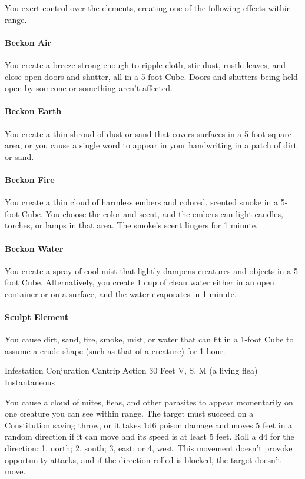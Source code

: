\documentclass[letterpaper,openany,oneside,twocolumn]{book}
\begin{document}
You exert control over the elements, creating one of the following effects within range.
\paragraph*{Beckon Air} You create a breeze strong enough to ripple cloth, stir dust, rustle leaves, and close open doors and shutter, all in a 5-foot Cube. Doors and shutters being held open by someone or something aren't affected.
\paragraph*{Beckon Earth} You create a thin shroud of dust or sand that covers surfaces in a 5-foot-square area, or you cause a single word to appear in your handwriting in a patch of dirt or sand.
\paragraph*{Beckon Fire} You create a thin cloud of harmless embers and colored, scented smoke in a 5-foot Cube. You choose the color and scent, and the embers can light candles, torches, or lamps in that area. The smoke's scent lingers for 1 minute.
\paragraph*{Beckon Water} You create a spray of cool mist that lightly dampens creatures and objects in a 5-foot Cube. Alternatively, you create 1 cup of clean water either in an open container or on a surface, and the water evaporates in 1 minute.
\paragraph*{Sculpt Element} You cause dirt, sand, fire, smoke, mist, or water that can fit in a 1-foot Cube to assume a crude shape (such as that of a creature) for 1 hour.

\DndSpellHeader
  {Infestation}
  {Conjuration Cantrip}
  {Action}
  {30 Feet}
  {V, S, M (a living flea)}
  {Instantaneous}

You cause a cloud of mites, fleas, and other parasites to appear momentarily on one creature you can see within range. The target must succeed on a Constitution saving throw, or it takes 1d6 poison damage and moves 5 feet in a random direction if it can move and its speed is at least 5 feet. Roll a d4 for the direction: 1, north; 2, south; 3, east; or 4, west. This movement doesn't provoke opportunity attacks, and if the direction rolled is blocked, the target doesn't move.
\end{document}
